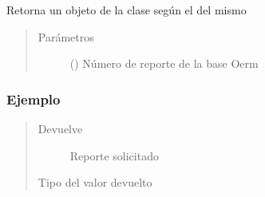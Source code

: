 \documentclass[a4paper,12pt,spanish]{sphinxmanual}
\begin{document}
\begin{fulllineitems}
\begin{fulllineitems}
\label{\detokenize{openerm.Reports:openerm.Reports.Reports.get_report}}
Retorna un objeto de la clase {\hyperref[\detokenize{openerm.Report:module-openerm.Report}]{}} según el  del mismo
\begin{quote}\begin{description}
\item[{Parámetros}] \leavevmode
{} () \textendash{} Número de reporte de la base Oerm

\end{description}\end{quote}
\subsubsection*{Ejemplo}

\begin{sphinxVerbatim}[commandchars=\\\{\}]
   
   
    
  
\end{sphinxVerbatim}
\begin{quote}\begin{description}
\item[{Devuelve}] \leavevmode
Reporte solicitado

\item[{Tipo del valor devuelto}] \leavevmode
{\hyperref[\detokenize{openerm.Report:module-openerm.Report}]{}}

\end{description}\end{quote}

\end{fulllineitems}


\end{fulllineitems}
\end{document}
